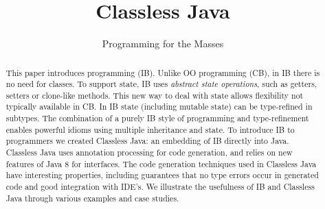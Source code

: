 \documentclass[10pt,preprint,nocopyrightspace,numbers]{sigplanconf}
\begin{document}
\setlength{\pdfpageheight}{\paperheight}
\setlength{\pdfpagewidth}{\paperwidth}




\title{Classless Java}
\subtitle{\InterfaceBased Programming for the Masses}

\authorinfo{}
           {}
           {}

\maketitle

\begin{abstract}
  This paper introduces \interfacebased \objectoriented
  programming (IB). Unlike \classbased OO programming (CB), in IB there
  is no need for classes. To support state, IB uses \emph{abstract state
    operations}, such as getters, setters or clone-like methods. This
  new way to deal with state allows flexibility not typically
  available in CB.  In IB state (including mutable state)
  can be type-refined in subtypes. The combination of a
  purely IB style of programming and type-refinement enables
  powerful idioms using multiple inheritance and state. To introduce
  IB to programmers we created Classless Java: an embedding of IB
  directly into Java. Classless Java uses annotation processing for
  code generation, and relies on new features of Java 8 for
  interfaces. The code generation techniques used in Classless Java
  have interesting properties, including guarantees that no type
  errors occur in generated code and good integration with IDE's. 
  We illustrate the usefulness of IB and Classless Java through various
  examples and case studies.
\end{abstract}

\begin{comment}
\category{CR-number}{subcategory}{third-level}

\terms
term1, term2

\keywords
keyword1, keyword2
\end{comment}
\end{document}
